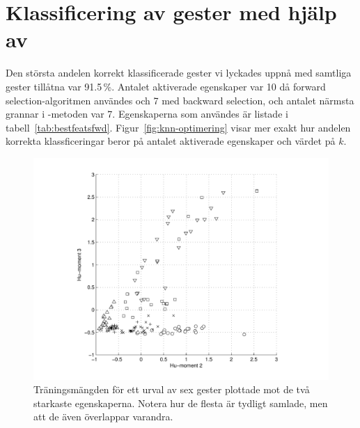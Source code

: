 \documentclass[../rapport_MVEX01-11-05]{subfiles}
\begin{document}
\section{Klassificering av gester med hjälp av \knn}
Den största andelen korrekt klassificerade gester vi lyckades uppnå
med samtliga gester tillåtna var 91.5\,\%. Antalet aktiverade
egenskaper var 10 då forward selection-algoritmen användes och 7 med
backward selection, och antalet närmsta grannar i \knn-metoden var 7. Egenskaperna som
användes är listade i
tabell~\vref{tab:bestfeatsfwd}. Figur~\vref{fig:knn-optimering} visar mer
exakt hur andelen korrekta
klassficeringar beror på antalet aktiverade egenskaper och värdet på $k$.

\begin{figure}[tbp]
  \centering
  \includegraphics[width=\textwidth,trim=2cm 0.5cm 2cm 0,clip=true]{bilder/feats-10+11}
  \caption{Träningsmängden för ett urval av sex gester plottade mot de två
	starkaste egenskaperna. Notera hur de flesta är tydligt samlade, men att
	de även överlappar varandra.}
  \label{fig:feats1011}
\end{figure}
\end{document}
